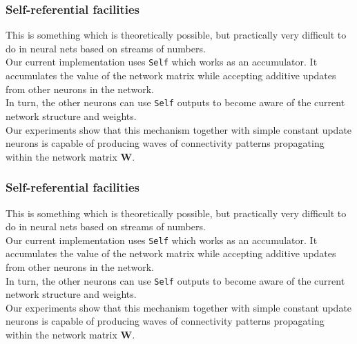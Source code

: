 \documentclass{beamer}
\newcommand{\msgray}[1]{{\color{mygray} #1}}
\begin{document}
\begin{frame}

  \frametitle{Self-referential facilities}

This is something which is theoretically possible, but practically very difficult
to do in neural nets based on streams of numbers.\\[2ex]

\msgray{Our current implementation uses {\tt Self} which works as an accumulator.
It accumulates the value of the network matrix while
accepting additive updates from other neurons in the network.\\[2ex]

In turn, the other neurons can use {\tt Self} outputs to become aware of
the current network structure and weights.\\[2ex]

Our experiments show that this mechanism together with simple
constant update neurons is capable of producing waves of connectivity
patterns propagating within the network matrix {\bf W}.}

\end{frame}

\begin{frame}

  \frametitle{Self-referential facilities}

This is something which is theoretically possible, but practically very difficult
to do in neural nets based on streams of numbers.\\[2ex]

Our current implementation uses {\tt Self} which works as an accumulator.
It accumulates the value of the network matrix while
accepting additive updates from other neurons in the network.\\[2ex]

\msgray{In turn, the other neurons can use {\tt Self} outputs to become aware of
the current network structure and weights.\\[2ex]

Our experiments show that this mechanism together with simple
constant update neurons is capable of producing waves of connectivity
patterns propagating within the network matrix {\bf W}.}

\end{frame}
\end{document}
